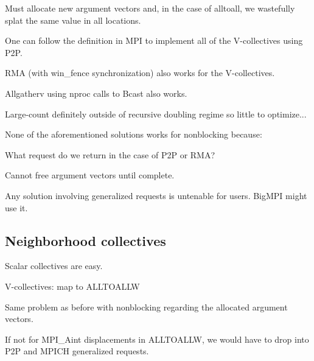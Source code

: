 Must allocate new argument vectors and, in the case of alltoall, we wastefully splat the same value in all locations.


One can follow the definition in MPI to implement all of the V-collectives using P2P.

RMA (with win\_fence synchronization) also works for the V-collectives.

Allgatherv using nproc calls to Bcast also works.

Large-count definitely outside of recursive doubling regime so little to optimize...


None of the aforementioned solutions works for nonblocking because:

What request do we return in the case of P2P or RMA?

Cannot free argument vectors until complete.

Any solution involving generalized requests is untenable for users.  BigMPI might use it.

\subsection{Neighborhood collectives}

Scalar collectives are easy.

V-collectives: map to ALLTOALLW

Same problem as before with nonblocking regarding the allocated argument vectors.

If not for MPI\_Aint displacements in ALLTOALLW, we would have to drop into P2P and MPICH generalized requests.

